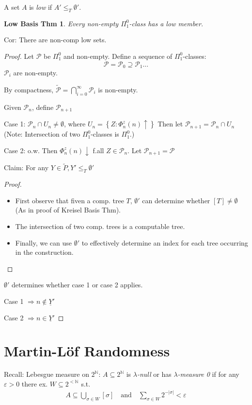 \documentclass[12pt]{article}
\newcommand{\Nat}{\ensuremath{\mathbb{N}}}
\begin{document}
A set $A$ is \emph{low} if $A' \le_T \emptyset'$.
\newtheorem{lowbasis}{Low Basis Thm}
\begin{lowbasis}
  Every non-empty $\Pi^0_1$-class has a low member.
\end{lowbasis}
Cor: There are non-comp low sets.
\begin{proof}
  Let $\mathcal{P}$ be $\Pi^0_1$ and non-empty.
  Define a sequence of $\Pi^0_1$-classes:
  \[
  \mathcal{P} = \mathcal{P}_0 \supseteq \mathcal{P}_1 \dots
  \]
  $\mathcal{P}_i$ are non-empty.

  By compactness, $\widetilde{\mathcal{P}} = \bigcap_{i=0}^\infty \mathcal{P}_i$ is non-empty.

  Given $\mathcal{P}_n$, define $\mathcal{P}_{n+1}$

  Case 1: $\mathcal{P}_n \cap U_n \ne \emptyset$,
  where $U_n = \left\{ Z : \Phi^z_n(n) \uparrow \right\}$
  Then let $\mathcal{P}_{n+1} = \mathcal{P}_n \cap U_n$
  (Note: Intersection of two $\Pi^0_1$-classes is $\Pi^0_1$.)

  Case 2: o.w.
  Then $\Phi^z_n(n) \downarrow$ f.all $Z \in \mathcal{P}_n$.
  Let $\mathcal{P}_{n+1} = \mathcal{P}$

  Claim: For any $Y \in \widetilde{P}, Y' \le_T \emptyset'$
  \begin{proof}
\begin{itemize}
  \item
    First observe that fiven a comp. tree $T$,
    $\emptyset'$ can determine whether $[T] \ne \emptyset$
    (As in proof of Kreisel Basis Thm).
  \item
    The intersection of two comp. trees is a computable tree.
  \item Finally, we can use $\emptyset'$ to effectively determine
    an index for each tree occurring in the construction.
\end{itemize}
  \end{proof}
  $\emptyset'$ determines whether case 1 or case 2 applies.

  Case 1 $\Rightarrow n \not\in \underline{Y}'$

  Case 2 $\Rightarrow n \in \underline{Y}'$
\end{proof}

\section{Martin-L\"of Randomness}

Recall: Lebesgue measure on $2^\Nat$:
$A \subseteq 2^\Nat$ is \emph{$\lambda$-null} or has \emph{$\lambda$-measure 0} if
for any $\varepsilon > 0$ there ex. $W \subseteq 2^{<\Nat}$ s.t.
\begin{align*}
  A \subseteq \bigcup_{\sigma \in W} [\sigma]
\quad \text{and} \quad
  \sum_{\sigma \in W} 2^{-|\sigma|} < \varepsilon
\end{align*}
\end{document}
